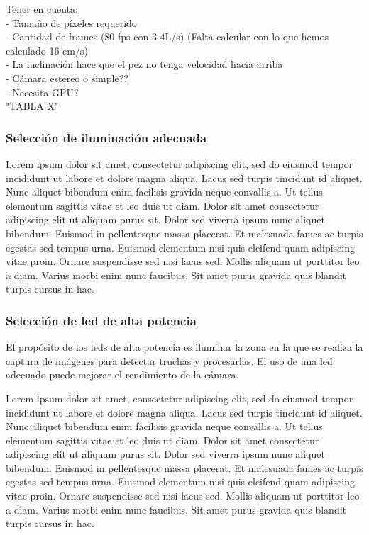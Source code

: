 Tener en cuenta: \\
- Tamaño de píxeles requerido \\
- Cantidad de frames (80 fps con 3-4L/s) (Falta calcular con lo que hemos calculado 16 cm/s) \\ 
- La inclinación hace que el pez no tenga velocidad hacia arriba \\
- Cámara estereo o simple?? \\
- Necesita GPU? \\

"TABLA X"

\subsubsection{Selección de iluminación adecuada} 
\label{sssec:seleccion de iluminacion adecuada}

Lorem ipsum dolor sit amet, consectetur adipiscing elit, sed do eiusmod tempor incididunt ut labore et dolore magna aliqua. Lacus sed turpis tincidunt id aliquet. Nunc aliquet bibendum enim facilisis gravida neque convallis a. Ut tellus elementum sagittis vitae et leo duis ut diam. Dolor sit amet consectetur adipiscing elit ut aliquam purus sit. Dolor sed viverra ipsum nunc aliquet bibendum. Euismod in pellentesque massa placerat. Et malesuada fames ac turpis egestas sed tempus urna. Euismod elementum nisi quis eleifend quam adipiscing vitae proin. Ornare suspendisse sed nisi lacus sed. Mollis aliquam ut porttitor leo a diam. Varius morbi enim nunc faucibus. Sit amet purus gravida quis blandit turpis cursus in hac.

\subsubsection{Selección de led de alta potencia} %
\label{sssec:seleccion de led de alta potencia}

El propósito de los leds de alta potencia es iluminar la zona en la que se realiza la captura de imágenes para detectar truchas y procesarlas. El uso de una led adecuado puede mejorar el rendimiento de la cámara.

Lorem ipsum dolor sit amet, consectetur adipiscing elit, sed do eiusmod tempor incididunt ut labore et dolore magna aliqua. Lacus sed turpis tincidunt id aliquet. Nunc aliquet bibendum enim facilisis gravida neque convallis a. Ut tellus elementum sagittis vitae et leo duis ut diam. Dolor sit amet consectetur adipiscing elit ut aliquam purus sit. Dolor sed viverra ipsum nunc aliquet bibendum. Euismod in pellentesque massa placerat. Et malesuada fames ac turpis egestas sed tempus urna. Euismod elementum nisi quis eleifend quam adipiscing vitae proin. Ornare suspendisse sed nisi lacus sed. Mollis aliquam ut porttitor leo a diam. Varius morbi enim nunc faucibus. Sit amet purus gravida quis blandit turpis cursus in hac.

